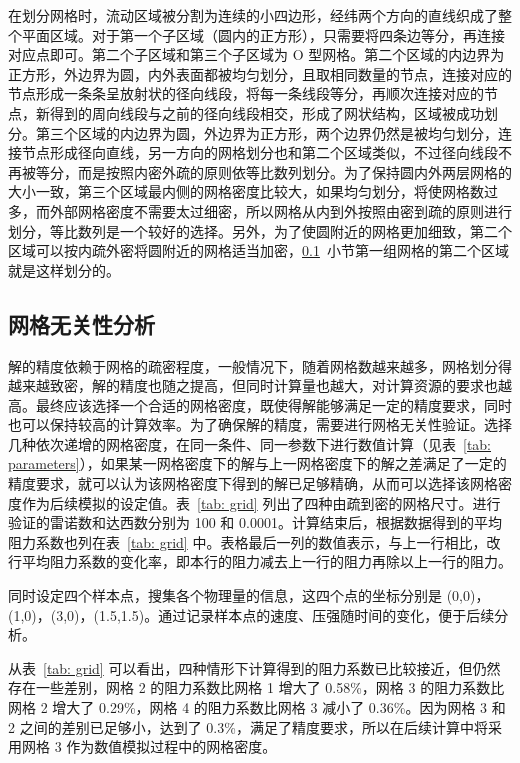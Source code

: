 在划分网格时，流动区域被分割为连续的小四边形，经纬两个方向的直线织成了整个平面区域。对于第一个子区域（圆内的正方形），只需要将四条边等分，再连接对应点即可。第二个子区域和第三个子区域为 O 型网格。第二个区域的内边界为正方形，外边界为圆，内外表面都被均匀划分，且取相同数量的节点，连接对应的节点形成一条条呈放射状的径向线段，将每一条线段等分，再顺次连接对应的节点，新得到的周向线段与之前的径向线段相交，形成了网状结构，区域被成功划分。第三个区域的内边界为圆，外边界为正方形，两个边界仍然是被均匀划分，连接节点形成径向直线，另一方向的网格划分也和第二个区域类似，不过径向线段不再被等分，而是按照内密外疏的原则依等比数列划分。为了保持圆内外两层网格的大小一致，第三个区域最内侧的网格密度比较大，如果均匀划分，将使网格数过多，而外部网格密度不需要太过细密，所以网格从内到外按照由密到疏的原则进行划分，等比数列是一个较好的选择。另外，为了使圆附近的网格更加细致，第二个区域可以按内疏外密将圆附近的网格适当加密，\ref{subsec: grid-independent}~小节第一组网格的第二个区域就是这样划分的。

\subsection{网格无关性分析}\label{subsec: grid-independent}

解的精度依赖于网格的疏密程度，一般情况下，随着网格数越来越多，网格划分得越来越致密，解的精度也随之提高，但同时计算量也越大，对计算资源的要求也越高。最终应该选择一个合适的网格密度，既使得解能够满足一定的精度要求，同时也可以保持较高的计算效率。为了确保解的精度，需要进行网格无关性验证。选择几种依次递增的网格密度，在同一条件、同一参数下进行数值计算（见表~\ref{tab: parameters}），如果某一网格密度下的解与上一网格密度下的解之差满足了一定的精度要求，就可以认为该网格密度下得到的解已足够精确，从而可以选择该网格密度作为后续模拟的设定值。表~\ref{tab: grid} 列出了四种由疏到密的网格尺寸。进行验证的雷诺数和达西数分别为 100 和 0.0001。计算结束后，根据数据得到的平均阻力系数也列在表~\ref{tab: grid} 中。表格最后一列的数值表示，与上一行相比，改行平均阻力系数的变化率，即本行的阻力减去上一行的阻力再除以上一行的阻力。

同时设定四个样本点，搜集各个物理量的信息，这四个点的坐标分别是 (0,0)，(1,0)，(3,0)，(1.5,1.5)。通过记录样本点的速度、压强随时间的变化，便于后续分析。

从表~\ref{tab: grid} 可以看出，四种情形下计算得到的阻力系数已比较接近，但仍然存在一些差别，网格 2 的阻力系数比网格 1 增大了 0.58\%，网格 3 的阻力系数比网格 2 增大了 0.29\%，网格 4 的阻力系数比网格 3 减小了 0.36\%。因为网格 3 和 2 之间的差别已足够小，达到了 0.3\%，满足了精度要求，所以在后续计算中将采用网格 3 作为数值模拟过程中的网格密度。

